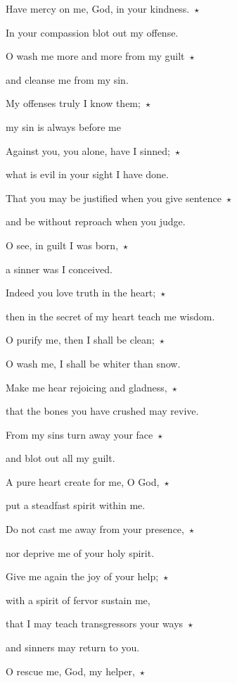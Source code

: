 \noindent Have mercy on me, God, in your kindness.~$\star$~\nopagebreak

In your compassion blot out my offense.

\noindent O wash me more and more from my guilt~$\star$~\nopagebreak

and cleanse me from my sin.

\noindent My offenses truly I know them;~$\star$~\nopagebreak

my sin is always before me

\noindent Against you, you alone, have I sinned;~$\star$~\nopagebreak

what is evil in your sight I have done.

\noindent That you may be justified when you give sentence~$\star$~\nopagebreak

and be without reproach when you judge.

\noindent O see, in guilt I was born,~$\star$~\nopagebreak

a sinner was I conceived.

\noindent Indeed you love truth in the heart;~$\star$~\nopagebreak

then in the secret of my heart teach me wisdom.

\noindent O purify me, then I shall be clean;~$\star$~\nopagebreak

O wash me, I shall be whiter than snow.

\noindent Make me hear rejoicing and gladness,~$\star$~\nopagebreak

that the bones you have crushed may revive.

\noindent From my sins turn away your face~$\star$~\nopagebreak

and blot out all my guilt.

\noindent A pure heart create for me, O God,~$\star$~\nopagebreak

put a steadfast spirit within me.

\noindent Do not cast me away from your presence,~$\star$~\nopagebreak

nor deprive me of your holy spirit.

\noindent Give me again the joy of your help;~$\star$~\nopagebreak

with a spirit of fervor sustain me,

\noindent that I may teach transgressors your ways~$\star$~\nopagebreak

and sinners may return to you.

\noindent O rescue me, God, my helper,~$\star$~\nopagebreak

